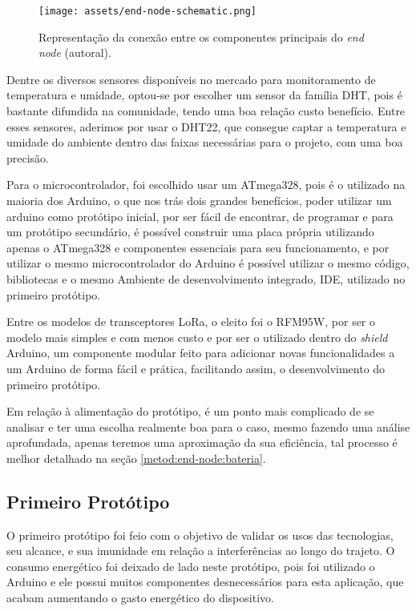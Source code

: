 \begin{figure}[H]
  \centering
  \texttt{[image: assets/end-node-schematic.png]} 
  \caption{Representação da conexão entre os componentes principais do \textit{end node} (autoral).}
  \label{fig:end-node-schematic} 
\end{figure}

Dentre os diversos sensores disponíveis no mercado para monitoramento de temperatura e umidade, optou-se por escolher um sensor da família DHT, pois é bastante difundida na comunidade, tendo uma boa relação custo benefício. Entre esses sensores, aderimos por usar o DHT22, que consegue captar a temperatura e umidade do ambiente dentro das faixas necessárias para o projeto, com uma boa precisão.

Para o microcontrolador, foi escolhido usar um ATmega328, pois é o utilizado na maioria dos Arduino, o que nos trás dois grandes benefícios, poder utilizar um arduino como protótipo inicial, por ser fácil de encontrar, de programar e para um protótipo secundário, é possível construir uma placa própria utilizando apenas o ATmega328 e componentes essenciais para seu funcionamento, e por utilizar o mesmo microcontrolador do Arduino é possível utilizar o mesmo código, bibliotecas e o mesmo Ambiente de desenvolvimento integrado, IDE, utilizado no primeiro protótipo.

Entre os modelos de transceptores LoRa, o eleito foi o RFM95W, por ser o modelo mais simples e com menos custo e por ser o utilizado dentro do \textit{shield} Arduino, um componente modular feito para adicionar novas funcionalidades a um Arduino de forma fácil e prática, facilitando assim, o desenvolvimento do primeiro protótipo.

Em relação à alimentação do protótipo, é um ponto mais complicado de se analisar e ter uma escolha realmente boa para o caso, mesmo fazendo uma análise aprofundada, apenas teremos uma aproximação da sua eficiência, tal processo é melhor detalhado na seção \ref{metod:end-node:bateria}.

\subsection{Primeiro Protótipo}
\label{metod:end-node:1-proto}
O primeiro protótipo foi feio com o objetivo de validar os usos das tecnologias, seu alcance, e sua imunidade em relação a interferências ao longo do trajeto. O consumo energético foi deixado de lado neste protótipo, pois foi utilizado o Arduino e ele possui muitos componentes desnecessários para esta aplicação, que acabam aumentando o gasto energético do dispositivo.

